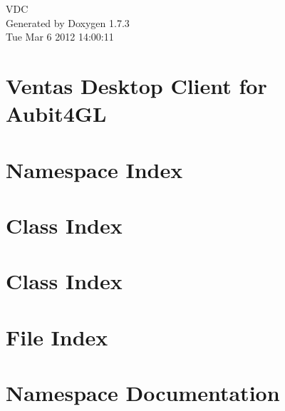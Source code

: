 \documentclass[a4paper]{book}
\begin{document}
\hypersetup{pageanchor=false}
\begin{titlepage}
\vspace*{7cm}
\begin{center}
{\Large VDC }\\
\vspace*{1cm}
{\large Generated by Doxygen 1.7.3}\\
\vspace*{0.5cm}
{\small Tue Mar 6 2012 14:00:11}\\
\end{center}
\end{titlepage}
\clearemptydoublepage
{}
\tableofcontents
\clearemptydoublepage
{}
\hypersetup{pageanchor=true}
\chapter{Ventas Desktop Client for Aubit4GL}
\label{index}\hypertarget{index}{}
\chapter{Namespace Index}

\chapter{Class Index}

\chapter{Class Index}

\chapter{File Index}

\chapter{Namespace Documentation}





\end{document}
